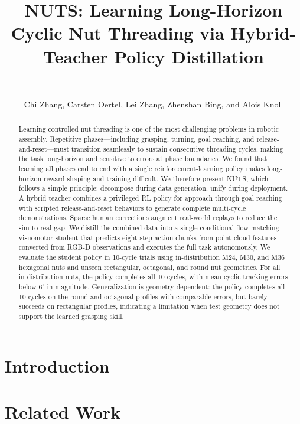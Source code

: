 \documentclass[letterpaper,10pt,conference]{ieeeconf}
\title{\LARGE \bfseries
  NUTS: Learning Long-Horizon Cyclic Nut Threading via Hybrid-Teacher
  Policy Distillation
}
\author{\vphantom{Author Names}\\\vphantom{Author Affiliations}}
\author{Chi Zhang, Carsten Oertel, Lei Zhang, Zhenshan Bing, and Alois Knoll}
\newcommand{\methodname}{NUTS\xspace}
\begin{document}
\maketitle
\setcounter{figure}{1}
\thispagestyle{empty}
\pagestyle{empty}

\begin{abstract}
Learning controlled nut threading is one of the most challenging problems in
robotic assembly. Repetitive phases---including grasping, turning, goal
reaching, and release-and-reset---must transition seamlessly to sustain
consecutive threading cycles, making the task long-horizon and sensitive to
errors at phase boundaries. We found that learning all phases end to end with a
single reinforcement-learning policy makes long-horizon reward shaping and
training difficult.
We therefore present \methodname, which follows a simple principle: decompose
during data generation, unify during deployment. A hybrid teacher combines a
privileged RL policy for approach through goal reaching with scripted
release-and-reset behaviors to generate complete multi-cycle demonstrations.
Sparse human corrections augment real-world replays to reduce the sim-to-real
gap. We distill the combined data into a single conditional
flow-matching visuomotor student that predicts eight-step action chunks from
point-cloud features converted from RGB-D observations and executes the full task autonomously.
We evaluate the student policy in
10-cycle trials using in-distribution M24, M30, and M36 hexagonal nuts and
unseen rectangular, octagonal, and round nut geometries. For all
in-distribution nuts, the policy completes all 10 cycles, with mean cyclic
tracking errors below $6^\circ$ in magnitude. Generalization is geometry dependent:
the policy completes all 10 cycles on the round and octagonal
profiles with comparable errors, but barely succeeds on rectangular profiles,
indicating a limitation when test geometry does not support the learned
grasping skill.
\end{abstract}

\section{Introduction}
\label{sec:introduction}


\section{Related Work}
\label{sec:related_work}


\end{document}
